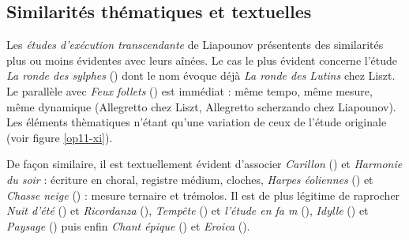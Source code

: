 \subsection{Similarités thématiques et textuelles}

Les \emph{études d'exécution transcendante} de Liapounov présentents des similarités plus ou moins évidentes avec leurs aînées. Le cas le plus évident concerne l'étude \emph{La ronde des sylphes} () dont le nom évoque déjà \emph{La ronde des Lutins} chez Liszt. Le parallèle avec \emph{Feux follets} () est immédiat : même tempo, même mesure, même dynamique (Allegretto chez Liszt, Allegretto scherzando chez Liapounov). Les éléments thèmatiques n'étant qu'une variation de ceux de l'étude originale (voir figure \ref{op11-xi}).

De façon similaire, il est textuellement évident d'associer \emph{Carillon} () et \emph{Harmonie du soir} : écriture en choral, registre médium, cloches, \emph{Harpes éoliennes} () et \emph{Chasse neige} () : mesure ternaire et trémolos. Il est de plus légitime de raprocher \emph{Nuit d'été} () et \emph{Ricordanza} (), \emph{Tempête} () et \emph{l'étude en fa m} (), \emph{Idylle} () et \emph{Paysage} () puis enfin \emph{Chant épique} () et \emph{Eroica} ().


